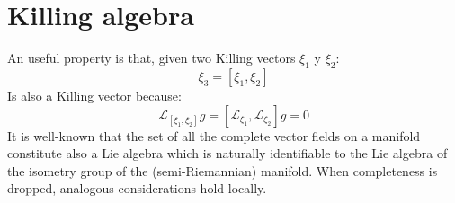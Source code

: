 \section{Killing algebra}
An useful property is that, given two Killing vectors $\xi_1$ y $\xi_2$:
\begin{equation}
\xi_3=[\xi_1,\xi_2]
\end{equation}
Is also a Killing vector because:
\begin{equation}
\mathcal{L}_{[\xi_1,\xi_2]} g=[\mathcal{L}_{\xi_1} ,\mathcal{L}_{\xi_2} ]g= 0
\end{equation} 
It is well-known that the set of all the complete vector fields on a manifold constitute also a Lie algebra which is naturally identifiable to the Lie algebra of the isometry group of the (semi-Riemannian) manifold.  When completeness is dropped, analogous considerations hold locally.